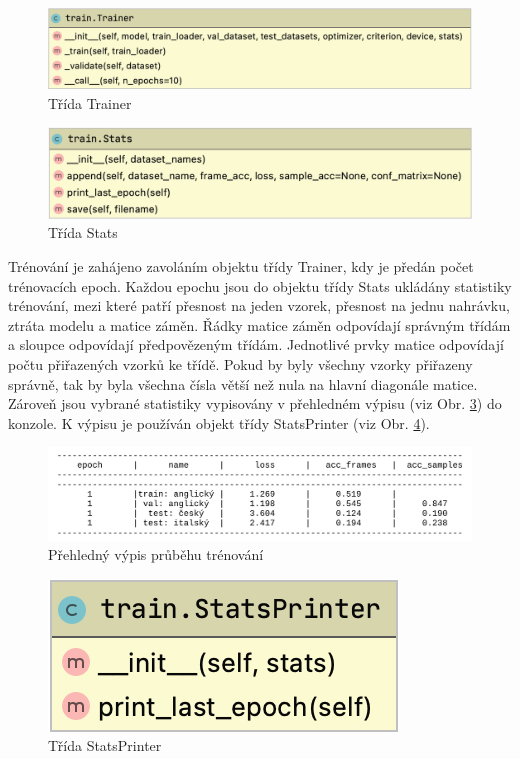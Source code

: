 \documentclass[FM,BP]{tulthesis}
\begin{document}
\begin{figure}[ht]
\centerline{\includegraphics[scale=.3]{train-trainer.png}}
\caption{Třída Trainer}
\label{fig:trainer}
\end{figure}
\FloatBarrier

\begin{figure}[ht]
\centerline{\includegraphics[scale=.33]{train-stats.png}}
\caption{Třída Stats}
\label{fig:stats}
\end{figure}
\FloatBarrier

Trénování je zahájeno zavoláním objektu třídy Trainer, kdy je předán počet trénovacích epoch. Každou epochu jsou do objektu třídy Stats ukládány statistiky trénování, mezi které patří přesnost na jeden vzorek, přesnost na jednu nahrávku, ztráta modelu a matice záměn. Řádky matice záměn odpovídají správným třídám a sloupce odpovídají předpovězeným třídám. Jednotlivé prvky matice odpovídají počtu přiřazených vzorků ke třídě. Pokud by byly všechny vzorky přiřazeny správně, tak by byla všechna čísla větší než nula na hlavní diagonále matice. Zároveň jsou vybrané statistiky vypisovány v přehledném výpisu (viz Obr. \ref{fig:print}) do konzole. K výpisu je používán objekt třídy StatsPrinter (viz Obr. \ref{fig:printer}).

\begin{figure}[ht]
\centerline{\includegraphics[scale=.215]{train_log.png}}
\caption{Přehledný výpis průběhu trénování}
\label{fig:print}
\end{figure}
\FloatBarrier

\begin{figure}[ht]
\centerline{\includegraphics[scale=.32]{train-stats_printer.png}}
\caption{Třída StatsPrinter}
\label{fig:printer}
\end{figure}
\FloatBarrier
\end{document}
